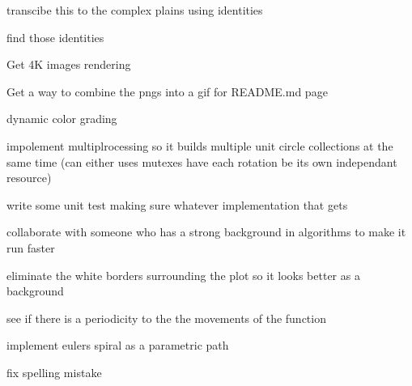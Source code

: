 
\begin{DoxyRefList}
\item[Class \mbox{\hyperlink{classEulersSpiral_1_1EulersSpiral}{Eulers\+Spiral.Eulers\+Spiral}} ]\label{todo__todo000001}%
%
transcibe this to the complex plains using identities 

find those identities  
\item[Namespace \mbox{\hyperlink{namespaceJulia}{Julia}} ]\label{todo__todo000002}%
%
Get 4K images rendering 

Get a way to combine the pngs into a gif for README.\+md page 

dynamic color grading 

impolement multiplrocessing so it builds multiple unit circle collections at the same time (can either uses mutexes have each rotation be its own independant resource) 

write some unit test making sure whatever implementation that gets 

collaborate with someone who has a strong background in algorithms to make it run faster 

eliminate the white borders surrounding the plot so it looks better as a background 

see if there is a periodicity to the the movements of the function 

implement eulers spiral as a parametric path  
\item[Member \mbox{\hyperlink{classJulia_1_1Julia_a966f5090e8ab789ab45b8bbe84435da9}{Julia.Julia.color\+\_\+map\+\_\+\+PIL}} (self, itterations\+\_\+til\+\_\+divergence)]\label{todo__todo000003}%
%
fix spelling mistake 
\end{DoxyRefList}